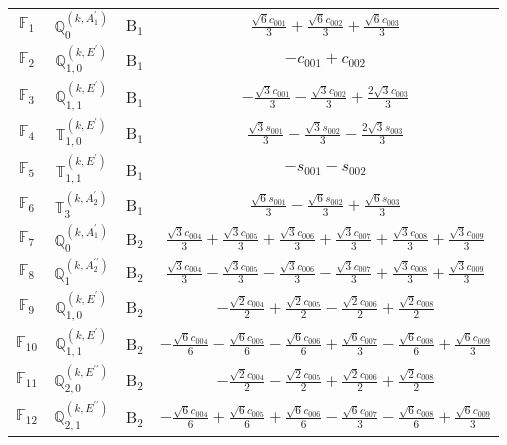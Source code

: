 \documentclass[fleqn,10pt,landscape]{article}
\begin{document}
\begin{itemize}
\begin{center}
\begin{longtable}{c|c|c|c}
$ \mathbb{F}_{1} $ & $\mathbb{Q}_{0}^{(k,A_{1}^{\prime})}$ & B$_{1}$ & $\frac{\sqrt{6} c_{001}}{3} + \frac{\sqrt{6} c_{002}}{3} + \frac{\sqrt{6} c_{003}}{3}$ \\
$ \mathbb{F}_{2} $ & $\mathbb{Q}_{1,0}^{(k,E^{\prime})}$ & B$_{1}$ & $- c_{001} + c_{002}$ \\
$ \mathbb{F}_{3} $ & $\mathbb{Q}_{1,1}^{(k,E^{\prime})}$ & B$_{1}$ & $- \frac{\sqrt{3} c_{001}}{3} - \frac{\sqrt{3} c_{002}}{3} + \frac{2 \sqrt{3} c_{003}}{3}$ \\
$ \mathbb{F}_{4} $ & $\mathbb{T}_{1,0}^{(k,E^{\prime})}$ & B$_{1}$ & $\frac{\sqrt{3} s_{001}}{3} - \frac{\sqrt{3} s_{002}}{3} - \frac{2 \sqrt{3} s_{003}}{3}$ \\
$ \mathbb{F}_{5} $ & $\mathbb{T}_{1,1}^{(k,E^{\prime})}$ & B$_{1}$ & $- s_{001} - s_{002}$ \\
$ \mathbb{F}_{6} $ & $\mathbb{T}_{3}^{(k,A_{2}^{\prime})}$ & B$_{1}$ & $\frac{\sqrt{6} s_{001}}{3} - \frac{\sqrt{6} s_{002}}{3} + \frac{\sqrt{6} s_{003}}{3}$ \\ \hline
$ \mathbb{F}_{7} $ & $\mathbb{Q}_{0}^{(k,A_{1}^{\prime})}$ & B$_{2}$ & $\frac{\sqrt{3} c_{004}}{3} + \frac{\sqrt{3} c_{005}}{3} + \frac{\sqrt{3} c_{006}}{3} + \frac{\sqrt{3} c_{007}}{3} + \frac{\sqrt{3} c_{008}}{3} + \frac{\sqrt{3} c_{009}}{3}$ \\
$ \mathbb{F}_{8} $ & $\mathbb{Q}_{1}^{(k,A_{2}^{\prime\prime})}$ & B$_{2}$ & $\frac{\sqrt{3} c_{004}}{3} - \frac{\sqrt{3} c_{005}}{3} - \frac{\sqrt{3} c_{006}}{3} - \frac{\sqrt{3} c_{007}}{3} + \frac{\sqrt{3} c_{008}}{3} + \frac{\sqrt{3} c_{009}}{3}$ \\
$ \mathbb{F}_{9} $ & $\mathbb{Q}_{1,0}^{(k,E^{\prime})}$ & B$_{2}$ & $- \frac{\sqrt{2} c_{004}}{2} + \frac{\sqrt{2} c_{005}}{2} - \frac{\sqrt{2} c_{006}}{2} + \frac{\sqrt{2} c_{008}}{2}$ \\
$ \mathbb{F}_{10} $ & $\mathbb{Q}_{1,1}^{(k,E^{\prime})}$ & B$_{2}$ & $- \frac{\sqrt{6} c_{004}}{6} - \frac{\sqrt{6} c_{005}}{6} - \frac{\sqrt{6} c_{006}}{6} + \frac{\sqrt{6} c_{007}}{3} - \frac{\sqrt{6} c_{008}}{6} + \frac{\sqrt{6} c_{009}}{3}$ \\
$ \mathbb{F}_{11} $ & $\mathbb{Q}_{2,0}^{(k,E^{\prime\prime})}$ & B$_{2}$ & $- \frac{\sqrt{2} c_{004}}{2} - \frac{\sqrt{2} c_{005}}{2} + \frac{\sqrt{2} c_{006}}{2} + \frac{\sqrt{2} c_{008}}{2}$ \\
$ \mathbb{F}_{12} $ & $\mathbb{Q}_{2,1}^{(k,E^{\prime\prime})}$ & B$_{2}$ & $- \frac{\sqrt{6} c_{004}}{6} + \frac{\sqrt{6} c_{005}}{6} + \frac{\sqrt{6} c_{006}}{6} - \frac{\sqrt{6} c_{007}}{3} - \frac{\sqrt{6} c_{008}}{6} + \frac{\sqrt{6} c_{009}}{3}$ \\

\end{longtable}
\end{center}
\end{itemize}
\end{document}
